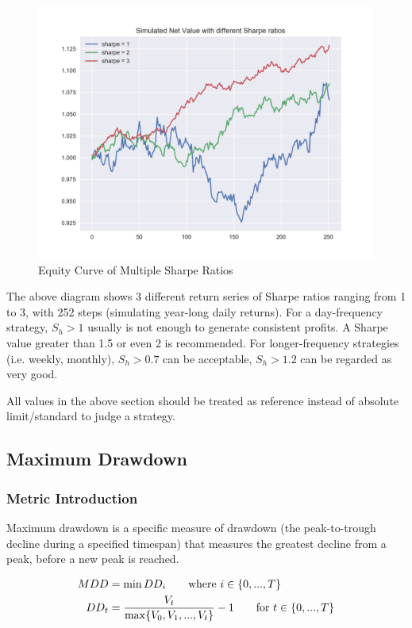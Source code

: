 \documentclass[12pt]{article}
\begin{document}
\begin{figure}[h!]
  \centering
  \includegraphics[scale=0.78]{./ref/figure/sharpe_nav_1200.png}
  \caption{Equity Curve of Multiple Sharpe Ratios}
  \label{fig:sharpe_navs}
\end{figure}

The above diagram shows 3 different return series of Sharpe ratios ranging from 1 to 3, with 252 steps (simulating year-long daily returns). For a day-frequency strategy, \(S_h > 1\) usually is not enough to generate consistent profits. A Sharpe value greater than 1.5 or even 2 is recommended. For longer-frequency strategies (i.e. weekly, monthly), \(S_h > 0.7\) can be acceptable, \(S_h > 1.2\) can be regarded as very good.

All values in the above section should be treated as reference instead of absolute limit/standard to judge a strategy.

\subsection{Maximum Drawdown}

\subsubsection*{Metric Introduction}

Maximum drawdown is a specific measure of drawdown (the peak-to-trough decline during a specified timespan) that measures the greatest decline from a peak, before a new peak is reached.

\begin{align*}
  MDD &= \min DD_i \tag*{where \(i \in {\{0, ..., T \}} \)} \\
  DD_t &= \frac{V_t}{\max \{V_0, V_1, ..., V_t \}}-1 \tag*{for \(t \in {\{0, ..., T \}} \)}
\end{align*}
\end{document}
